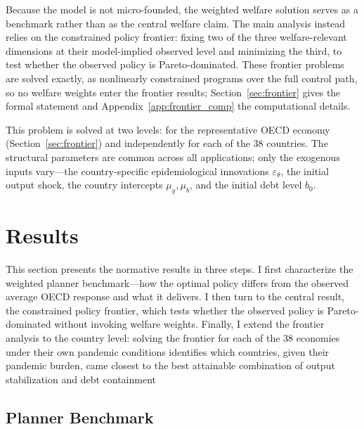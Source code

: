 \documentclass[12pt, a4paper]{article}
\begin{document}
Because the model is not micro-founded, the weighted welfare solution serves as a benchmark rather than as the central welfare claim. The main analysis instead relies on the constrained policy frontier: fixing two of the three welfare-relevant dimensions at their model-implied observed level and minimizing the third, to test whether the observed policy is Pareto-dominated. These frontier problems are solved exactly, as nonlinearly constrained programs over the full control path, so no
welfare weights enter the frontier results; Section~\ref{sec:frontier} gives the formal
statement and Appendix~\ref{app:frontier_comp} the computational details.


This problem is solved at two levels: for the representative OECD economy (Section~\ref{sec:frontier}) and independently for each of the 38 countries. The structural parameters are common across all applications; only the exogenous inputs vary---the country-specific epidemiological innovations \(\varepsilon_\theta\), the initial output shock, the country intercepts \(\mu_y, \mu_b\), and the initial debt level \(b_0\).


\section{Results}
\label{sec:results}

This section presents the normative results in three steps. I first characterize the weighted planner benchmark---how the optimal policy differs from the observed average OECD response and what it delivers. I then turn to the central result, the constrained policy frontier, which tests whether the observed policy is Pareto-dominated without invoking welfare weights. Finally,
I extend the frontier analysis to the country level: solving the frontier for each of the 38 economies under their own pandemic conditions identifies which countries, given their pandemic burden, came closest to the best attainable combination of output stabilization and debt containment

\subsection{Planner Benchmark}
\label{subsec:results_benchmark}
\end{document}
